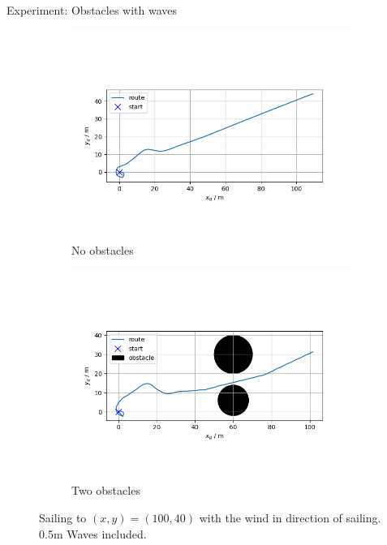 \documentclass[10pt,xcolor={table,dvipsnames},t]{beamer}
\begin{document}
\begin{frame}{Experiment: Obstacles with waves}
    \begin{figure}
     \centering
      \begin{subfigure}[b]{0.49\textwidth}
         \centering
         \includegraphics[width=\textwidth,trim={0.5cm 2cm 1.25cm 2.5cm },clip]{Figures/no-obstacle-waves-wind-5-65/position.png}
         \caption{No obstacles}
         \label{fig:no_obstacle_waves}
     \end{subfigure}
     \begin{subfigure}[b]{0.49\textwidth}
         \centering
         \includegraphics[width=\textwidth,trim={0.5cm 2cm 1.25cm 2.5cm },clip]{Figures/Obstacles-waves-wind-4-45/position-(with-waves).png}
         \caption{Two obstacles}
         \label{fig:obstacles_waves}
     \end{subfigure}
    
    \caption{Sailing to \((x,y)=(100,40)\) with the wind in direction of sailing. 0.5m Waves included.}
    \label{fig:sail_with_wind}
\end{figure}
\end{frame}
\end{document}
